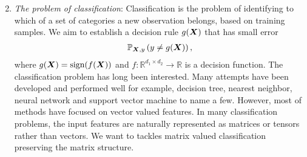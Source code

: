 \documentclass[12pt]{article}
\begin{document}
\begin{enumerate}[label={2.\arabic*}]
\setcounter{enumi}{1}
\item {\it The problem of classification}: Classification is the problem of identifying to which of a set of categories a new observation belongs, based on training samples. We aim to establish a decision rule $g(\bm X)$ that has small error
\begin{align}
    \mathbb{P}_{\bm X,y}\left(y\neq g(\bm X)\right),
\end{align}
where $g(\bm X) = \text{sign}(f(\bm X))$ and $f:\mathbb{R}^{d_1\times d_2}\rightarrow \mathbb{R}$ is a decision function. The classification problem has long been interested. Many attempts have been developed and performed well for example, decision tree, nearest neighbor, neural network and support vector machine to name a few. However, most of methods have focused on vector valued features. In many classification problems, the input features are naturally represented as matrices or tensors rather than vectors. 
We want to tackles matrix valued classification preserving the matrix structure.



\end{enumerate}
\end{document}
